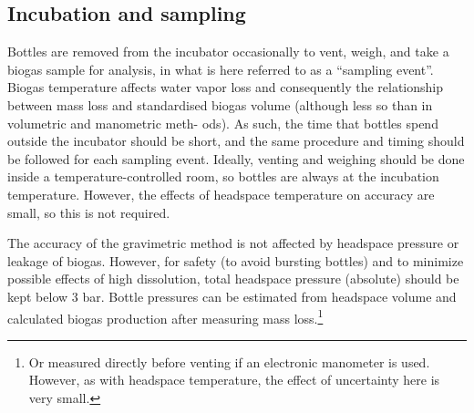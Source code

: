 \documentclass[]{article}
\begin{document}
\subsection{Incubation and sampling}
Bottles are removed from the incubator occasionally to vent, weigh, and take a biogas sample for analysis, in what is here referred to as a “sampling event”. 
Biogas temperature affects water vapor loss and consequently the relationship between mass loss and standardised biogas volume (although less so than in volumetric and manometric meth- ods). 
As such, the time that bottles spend outside the incubator should be short, and the same procedure and timing should be followed for each sampling event. 
Ideally, venting and weighing should be done inside a temperature-controlled room, so bottles are always at the incubation temperature. 
However, the effects of headspace temperature on accuracy are small, so this is not required.  

The accuracy of the gravimetric method is not affected by headspace pressure or leakage of biogas. 
However, for safety (to avoid bursting bottles) and to minimize possible effects of high  dissolution, total headspace pressure (absolute) should be kept below 3 bar.  
Bottle pressures can be estimated from headspace volume and calculated biogas production after measuring mass loss.\footnote{
  Or measured directly before venting if an electronic manometer is used.
  However, as with headspace temperature, the effect of uncertainty here is very small.
}
\end{document}
